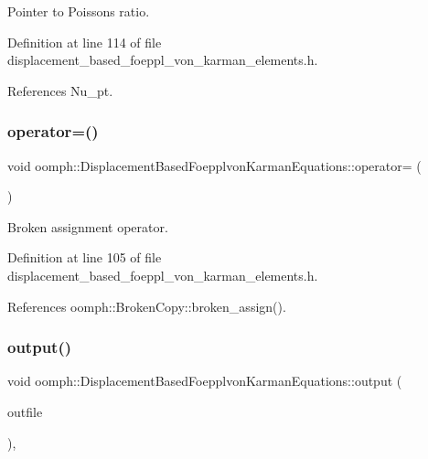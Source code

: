 Pointer to Poisson\textquotesingle{}s ratio. 



Definition at line 114 of file displacement\+\_\+based\+\_\+foeppl\+\_\+von\+\_\+karman\+\_\+elements.\+h.



References Nu\+\_\+pt.

\mbox{\label{classoomph_1_1DisplacementBasedFoepplvonKarmanEquations_ace360539e3055692532819fa62060494}} 
\subsubsection{\texorpdfstring{operator=()}{operator=()}}
{\footnotesize\ttfamily void oomph\+::\+Displacement\+Based\+Foepplvon\+Karman\+Equations\+::operator= (\begin{DoxyParamCaption}\item[{const \hyperlink{classoomph_1_1DisplacementBasedFoepplvonKarmanEquations}{Displacement\+Based\+Foepplvon\+Karman\+Equations} \&}]{ }\end{DoxyParamCaption})\hspace{0.3cm}{\ttfamily [inline]}}



Broken assignment operator. 



Definition at line 105 of file displacement\+\_\+based\+\_\+foeppl\+\_\+von\+\_\+karman\+\_\+elements.\+h.



References oomph\+::\+Broken\+Copy\+::broken\+\_\+assign().

\mbox{\label{classoomph_1_1DisplacementBasedFoepplvonKarmanEquations_a7e806927a451e21dc0b2f10cf98a5941}} 
\subsubsection{\texorpdfstring{output()}{output()}\hspace{0.1cm}{\footnotesize\ttfamily [1/4]}}
{\footnotesize\ttfamily void oomph\+::\+Displacement\+Based\+Foepplvon\+Karman\+Equations\+::output (\begin{DoxyParamCaption}\item[{std\+::ostream \&}]{outfile }\end{DoxyParamCaption})\hspace{0.3cm}{\ttfamily [inline]}, {\ttfamily [virtual]}}



